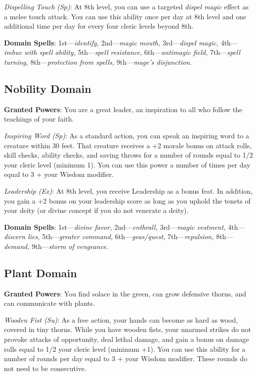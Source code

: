 \textit{Dispelling Touch} \textit{(Sp)}: At 8th level, you can use a targeted \textit{dispel magic} effect as a melee touch attack. You can use this ability once per day at 8th level and one additional time per day for every four cleric levels beyond 8th.
				
\textbf{Domain Spells}: 1st---\textit{identify, }2nd---\textit{magic mouth,} 3rd---\textit{dispel magic, }4th---\textit{imbue with spell ability, }5th---\textit{spell resistance, }6th---\textit{antimagic field, }7th---\textit{spell turning, }8th---\textit{protection from spells, }9th---\textit{mage's disjunction}.
				
\subsection{Nobility Domain}

				
\textbf{Granted Powers}: You are a great leader, an inspiration to all who follow the teachings of your faith.
				
\textit{Inspiring Word (Sp)}: As a standard action, you can speak an inspiring word to a creature within 30 feet. That creature receives a +2 morale bonus on attack rolls, skill checks, ability checks, and saving throws for a number of rounds equal to 1/2 your cleric level (minimum 1). You can use this power a number of times per day equal to 3 + your Wisdom modifier.
				
\textit{Leadership (Ex)}: At 8th level, you receive Leadership as a bonus feat. In addition, you gain a +2 bonus on your leadership score as long as you uphold the tenets of your deity (or divine concept if you do not venerate a deity). 
				
\textbf{Domain Spells}: 1st---\textit{divine favor, }2nd---\textit{enthrall,} 3rd---\textit{magic vestment, }4th---\textit{discern lies, }5th---\textit{greater command, }6th---\textit{geas/quest, }7th---\textit{repulsion, }8th---\textit{demand, }9th---\textit{storm of vengeance}.
				
\subsection{Plant Domain}

				
\textbf{Granted Powers}: You find solace in the green, can grow defensive thorns, and can communicate with plants.
				
\textit{Wooden Fist (Su)}: As a free action, your hands can become as hard as wood, covered in tiny thorns. While you have wooden fists, your unarmed strikes do not provoke attacks of opportunity, deal lethal damage, and gain a bonus on damage rolls equal to 1/2 your cleric level (minimum +1). You can use this ability for a number of rounds per day equal to 3 + your Wisdom modifier. These rounds do not need to be consecutive.
				
